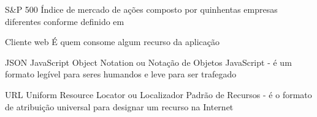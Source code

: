 \begin{siglas}
    \item[S\&P 500] Índice de mercado de ações composto por
                    quinhentas empresas diferentes conforme definido
                    em 

    \item[Cliente web] É quem consome algum recurso da aplicação

    \item[JSON] JavaScript Object Notation ou Notação de Objetos JavaScript -
                é um formato legível para seres humandos e leve para ser trafegado \cite{define-json}

    \item[URL] Uniform Resource Locator ou Localizador Padrão de Recursos -
               é o formato de atribuição universal para designar um recurso na Internet
\end{siglas}
